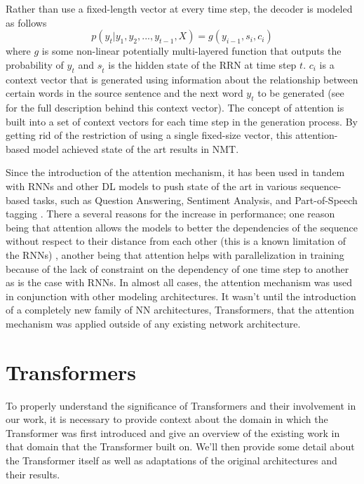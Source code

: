 Rather than use a fixed-length vector at every time step, the decoder is modeled as follows $$p(y_t \vert y_1, y_2, ..., y_{t-1}, X) = g(y_{i-1}, s_i, c_i)$$ where $g$ is some non-linear potentially multi-layered function that outputs the probability of $y_{t}$ and $s_{\hat{t}}$ is the hidden state of the RRN at time step $t$. $c_i$ is a context vector that is generated using information about the relationship between certain words in the source sentence and the next word $y_t$ to be generated (see \citet{bahdanau2014neural} for the full description behind this context vector). The concept of attention is built into a set of context vectors for each time step in the generation process. By getting rid of the restriction of using a single fixed-size vector, this attention-based model achieved state of the art results in NMT. 

Since the introduction of the attention mechanism, it has been used in tandem with RNNs and other DL models to push state of the art in various sequence-based tasks, such as Question Answering, Sentiment Analysis, and Part-of-Speech tagging \cite{chaudhari2019attentive}. There a several reasons for the increase in performance; one reason being that attention allows the models to better the dependencies of the sequence without respect to their distance from each other (this is a known limitation of the RNNs) \cite{vaswani2017attention}, another being that attention helps with parallelization in training because of the lack of constraint on the dependency of one time step to another as is the case with RNNs. In almost all cases, the attention mechanism was used in conjunction with other modeling architectures. It wasn't until the introduction of a completely new family of NN architectures, Transformers, that the attention mechanism was applied outside of any existing network architecture.


\section{Transformers}
To properly understand the significance of Transformers and their involvement in our work, it is necessary to provide context about the domain in which the Transformer was first introduced and give an overview of the existing work in that domain that the Transformer built on. We'll then provide some detail about the Transformer itself as well as adaptations of the original architectures and their results. 

